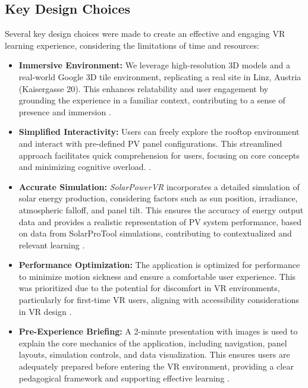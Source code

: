 \documentclass[draft, final]{vutinfth} %
\begin{document}
\subsection{Key Design Choices}

Several key design choices were made to create an effective and engaging VR learning experience, considering the limitations of time and resources:

\begin{itemize}
    \item \textbf{Immersive Environment:} We leverage high-resolution 3D models and a real-world Google 3D tile environment, replicating a real site in Linz, Austria (Kaisergasse 20). This enhances relatability and user engagement by grounding the experience in a familiar context, contributing to a sense of presence and immersion \cite{HuAu2018VrExperience, Winn2002Immersion}.
    \item \textbf{Simplified Interactivity:} Users can freely explore the rooftop environment and interact with pre-defined PV panel configurations. This streamlined approach facilitates quick comprehension for users, focusing on core concepts and minimizing cognitive overload. \cite{Dalgarno2010Learning, Mikropoulos2011VrEducational}.
    \item \textbf{Accurate Simulation:} \textit{SolarPowerVR} incorporates a detailed simulation of solar energy production, considering factors such as sun position, irradiance, atmospheric falloff, and panel tilt. This ensures the accuracy of energy output data and provides a realistic representation of PV system performance, based on data from SolarProTool simulations, contributing to contextualized and relevant learning \cite{Dalgarno2010Learning, HuAu2018VrExperience}.
    \item \textbf{Performance Optimization:} The application is optimized for performance to minimize motion sickness and ensure a comfortable user experience. This was prioritized due to the potential for discomfort in VR environments, particularly for first-time VR users, aligning with accessibility considerations in VR design \cite{Lege2020VrProgress, Winn2002Immersion}.
    \item \textbf{Pre-Experience Briefing:} A 2-minute presentation with images is used to explain the core mechanics of the application, including navigation, panel layouts, simulation controls, and data visualization. This ensures users are adequately prepared before entering the VR environment, providing a clear pedagogical framework and supporting effective learning \cite{HuAu2018VrExperience, Lege2020VrProgress}.
\end{itemize}
\end{document}
